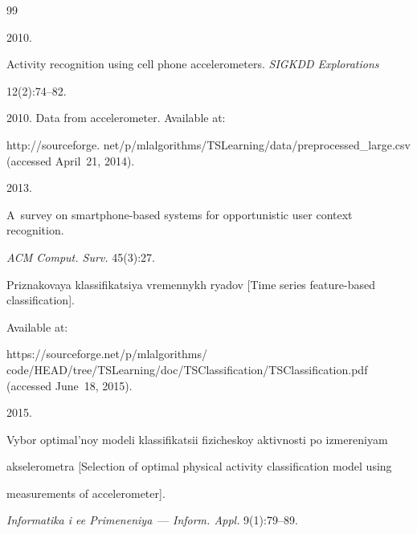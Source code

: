 {\small\frenchspacing

{%


\begin{thebibliography}{99}


 2010. 

Activity recognition using cell phone accelerometers. \textit{SIGKDD Explorations} 

12(2):74--82.




 2010.  Data from accelerometer. Available at: 

{\sf http://sourceforge. net/p/mlalgorithms/TSLearning/data/preprocessed\_large.csv} (accessed April~21, 2014).




 2013. 

A~survey on smartphone-based systems for opportunistic user context recognition. 

\textit{ACM Comput. Surv.} 45(3):27.





Priznakovaya klassifikatsiya vremennykh ryadov [Time series feature-based classification]. 

Available at:

{\sf https://sourceforge.net/p/mlalgorithms/ code/HEAD/tree/TSLearning/doc/TSClassification/TSClassification.pdf} (accessed June~18, 2015).




 2015. 

Vybor optimal'noy modeli klassifikatsii fizicheskoy aktivnosti po izmereniyam 

akselerometra [Selection of optimal physical activity classification model using 

measurements of accelerometer]. 

\textit{Informatika i ee Primeneniya}~--- \textit{Inform. Appl.} 9(1):79--89.




\end{thebibliography}}}
